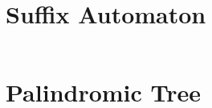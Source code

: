 \section{Suffix Automaton}

\inputminted{cpp}{code/maximalist_tomato.cpp}

\section{Palindromic Tree}

\inputminted{cpp}{code/palindromic_tree.cpp}
